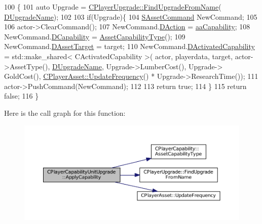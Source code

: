 \begin{DoxyCode}
100                                                                                                            
                                                               \{
101     \textcolor{keyword}{auto} Upgrade = \hyperlink{classCPlayerUpgrade_af47a08aba3a1a5b2cefacef24065a82e}{CPlayerUpgrade::FindUpgradeFromName}(
      \hyperlink{classCPlayerCapabilityUnitUpgrade_a5de8bffd6935c699f431329ad4ee5eec}{DUpgradeName});
102     
103     \textcolor{keywordflow}{if}(Upgrade)\{
104         \hyperlink{structSAssetCommand}{SAssetCommand} NewCommand;
105         
106         actor->ClearCommand();
107         NewCommand.\hyperlink{structSAssetCommand_a8edd3b3d59a76d5514ba403bc8076a75}{DAction} = \hyperlink{GameDataTypes_8h_ab47668e651a3032cfb9c40ea2d60d670acf9fb164e8abd71c71f4a8c7fda360d4}{aaCapability};
108         NewCommand.\hyperlink{structSAssetCommand_a734ea7c6847457b437360f333f570ff9}{DCapability} = \hyperlink{classCPlayerCapability_a433bb196cd6ab6a932f1cac102b3aa98}{AssetCapabilityType}();
109         NewCommand.\hyperlink{structSAssetCommand_a3d9b43f6e59c386c48c41a65448a0c39}{DAssetTarget} = target;
110         NewCommand.\hyperlink{structSAssetCommand_ad8beda19520811cc70fe1eab16c774dd}{DActivatedCapability} = std::make\_shared< CActivatedCapability >(
      actor, playerdata, target, actor->AssetType(), \hyperlink{classCPlayerCapabilityUnitUpgrade_a5de8bffd6935c699f431329ad4ee5eec}{DUpgradeName}, Upgrade->LumberCost(), Upgrade->
      GoldCost(), \hyperlink{classCPlayerAsset_a0aff85b9552967a42f4f3f42cb59c19f}{CPlayerAsset::UpdateFrequency}() * Upgrade->ResearchTime());
111         actor->PushCommand(NewCommand);
112         
113         \textcolor{keywordflow}{return} \textcolor{keyword}{true};
114     \}
115     \textcolor{keywordflow}{return} \textcolor{keyword}{false};
116 \}
\end{DoxyCode}
Here is the call graph for this function\+:\nopagebreak
\begin{figure}[H]
\begin{center}
\leavevmode
\includegraphics[width=350pt]{classCPlayerCapabilityUnitUpgrade_a8cc6fee17dd178fd798e36c3d5301e9d_cgraph}
\end{center}
\end{figure}
